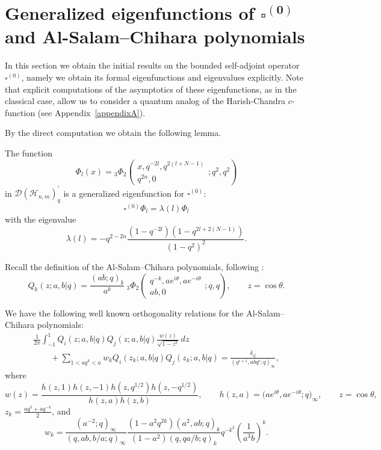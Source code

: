 \section[Generalized eigenfunctions of $\square^{(0)}$ and Al-Salam-Chihara polynomials]{Generalized eigenfunctions of $\boldsymbol{\square^{(0)}}$\\ and Al-Salam--Chihara polynomials}\label{sec_7}

In this section we obtain the initial results on the bounded self-adjoint operator $\square^{(0)}$, namely we
obtain its formal eigenfunctions and eigenvalues explicitly. Note that explicit computations of the
asymptotics of these eigenfunctions, as in the classical case, allow us to consider a quantum analog of the
Harish-Chandra $c$-function (see Appendix~\ref{appendixA}).

By the direct computation we obtain the following lemma.

\begin{lemma}\label{c1.5.2} The function
\[
\Phi_l(x) = {_{3}\Phi_{2}}\left(
\begin{array}{c}
x,q^{-2l},q^{2(l+N-1)}\\ q^{2n},0
\end{array}
;q^2,q^2\right)
\]
in $\mathscr{D}(\mathscr{H}_{n,m})_q^\prime$ is a generalized eigenfunction for $\square^{(0)}$:
\[\square^{(0)} \Phi_l=\lambda(l)\Phi_l\] with the eigenvalue
\[
\lambda(l) = - q^{2-2n}\frac{(1-q^{-2l})(1-q^{2l+2(N-1)})}{(1-q^2)^2}.
\]
\end{lemma}



Recall the def\/inition of the Al-Salam--Chihara polynomials, following \cite{koekoek}:
\[
Q_k(z;a,b|q)=\frac{(ab;q)_k}{a^k}\ {_{3}\Phi_{2}}\left(
\begin{array}{c}
q^{-k},a e^{i\theta},ae^{-i\theta}\\ ab,0
\end{array}
;q,q\right), \qquad z=\cos\theta.
\]

We have the following well known orthogonality relations for the Al-Salam--Chihara polynomials:
\begin{gather}
\frac{1}{2\pi}\int_{-1}^1 Q_i(z;a,b|q)Q_j(z;a,b|q)\frac{w(z)}{\sqrt{1-z^2}}\,dz\nonumber\\
\qquad{}+\sum_{1<aq^k<a}w_k Q_i(z_k;a,b|q)Q_j(z_k;a,b|q)=\frac{\delta_{ij}}{(q^{i+1},abq^i;q)_\infty},\label{rel_orth_ASC}
\end{gather}
where
\[
w(z)=\frac{h(z,1)h(z,-1)h(z,q^{1/2})h(z,-q^{1/2})}{h(z,a)h(z,b)}, \!\!\qquad
h(z,a)=\big(ae^{i\theta},ae^{-i\theta};q\big)_{\infty},\!\! \qquad z=\cos\theta,
\]
$z_k=\frac{aq^k+aq^{-k}}{2}$, and
\[
w_k=\frac{(a^{-2};q)_\infty}{(q,ab,b/a;q)_\infty}\frac{(1-a^2q^{2k})(a^2,ab;q)_k}
{(1-a^2)(q,qa/b;q)_k}q^{-k^2}\left(\frac{1}{a^3b}\right)^k.
\]

